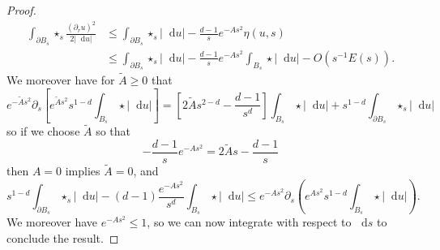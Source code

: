 \documentclass[reqno,10pt]{amsart}
\newcommand*\dif{\mathop{}\!\mathrm{d}}
\theoremstyle{definition}
\numberwithin{equation}{section}
\begin{document}
\begin{proof}
\begin{align*}
\int_{\partial B_s} \star_s \frac{(\partial_r u)^2}{2|\dif u|} &\leq \int_{\partial B_s} \star_s |\dif u| - \frac{d - 1}{s} e^{-As^2} \eta(u, s)\\
&\leq \int_{\partial B_s} \star_s |\dif u| - \frac{d - 1}{s} e^{-As^2} \int_{B_s} \star |\dif u| - O(s^{-1}E(s)).
\end{align*}
We moreover have for $\tilde A \geq 0$ that
$$e^{-\tilde As^2} \partial_s \left[e^{\tilde As^2} s^{1 - d} \int_{B_s} \star |\dif u|\right] = \left[2\tilde As^{2 - d} - \frac{d - 1}{s^d}\right]\int_{B_s} \star |\dif u| + s^{1 - d} \int_{\partial B_s} \star_s |\dif u|$$
so if we choose $\tilde A$ so that
$$-\frac{d - 1}{s} e^{-As^2} = 2\tilde As - \frac{d - 1}{s}$$
then $A = 0$ implies $\tilde A = 0$, and
$$s^{1 - d} \int_{\partial B_s} \star_s |\dif u| - (d - 1)\frac{e^{-As^2}}{s^d} \int_{B_s} \star|\dif u| \leq e^{-As^2} \partial_s\left(e^{As^2} s^{1 - d} \int_{B_s} \star|\dif u|\right).$$
We moreover have $e^{-As^2} \leq 1$, so we can now integrate with respect to $\dif s$ to conclude the result.
\end{proof}
\end{document}
